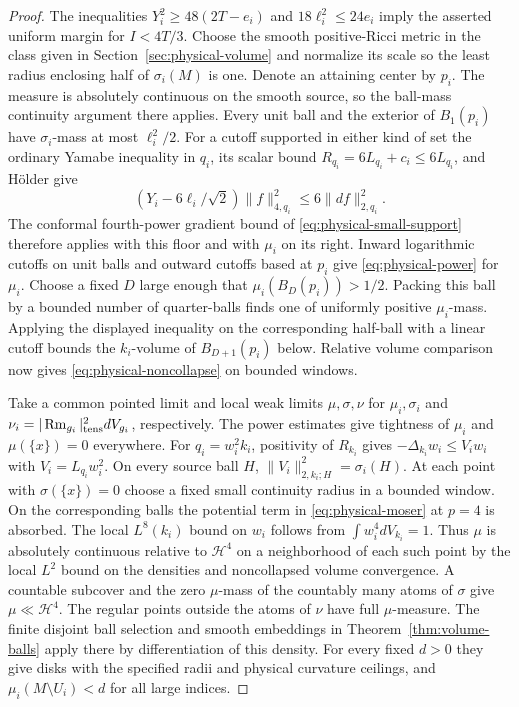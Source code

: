 \begin{proof}
The inequalities \(Y_i^2\ge48(2T-e_i)\) and
\(18\ell_i^2\le24e_i\) imply the asserted uniform margin for
\(I<4T/3\). Choose the smooth positive-Ricci metric in the class
given in Section~\ref{sec:physical-volume} and normalize its scale
so the least radius enclosing half of \(\sigma_i(M)\) is one.
Denote an attaining center by \(p_i\). The measure is absolutely
continuous on the smooth source, so the ball-mass continuity argument
there applies. Every unit ball and the exterior of \(B_1(p_i)\)
have \(\sigma_i\)-mass at most \(\ell_i^2/2\). For a cutoff
supported in either kind of set the ordinary Yamabe inequality in
\(q_i\), its scalar bound \(R_{q_i}=6L_{q_i}+c_i\le6L_{q_i}\),
and H\"older give
\[
 (Y_i-6\ell_i/\sqrt 2)\|f\|_{4,q_i}^2\le6\|df\|_{2,q_i}^2.
\]
The conformal fourth-power gradient bound of
\eqref{eq:physical-small-support} therefore applies with this floor
and with \(\mu_i\) on its right. Inward logarithmic cutoffs on
unit balls and outward cutoffs based at \(p_i\) give
\eqref{eq:physical-power} for \(\mu_i\). Choose a fixed \(D\) large
enough that \(\mu_i(B_D(p_i))>1/2\). Packing this ball by a bounded
number of quarter-balls finds one of uniformly positive
\(\mu_i\)-mass. Applying the displayed inequality on the
corresponding half-ball with a linear cutoff bounds the
\(k_i\)-volume of \(B_{D+1}(p_i)\) below. Relative volume comparison
now gives \eqref{eq:physical-noncollapse} on bounded windows.

Take a common pointed limit and local weak limits
\(\mu,\sigma,\nu\) for \(\mu_i,\sigma_i\) and
\(\nu_i=|\operatorname{Rm}_{g_i}|^2_{\rm tens}dV_{g_i}\), respectively.
The power estimates give tightness of \(\mu_i\) and
\(\mu(\{x\})=0\) everywhere. For \(q_i=w_i^2k_i\), positivity
of \(R_{k_i}\) gives
\(-\Delta_{k_i}w_i\le V_iw_i\) with \(V_i=L_{q_i}w_i^2\).
On every source ball \(H\), \(\|V_i\|_{2,k_i;H}^2=\sigma_i(H)\).
At each point with \(\sigma(\{x\})=0\) choose a fixed small
continuity radius in a bounded window. On the corresponding balls
the potential term in \eqref{eq:physical-moser} at \(p=4\) is
absorbed. The local \(L^8(k_i)\) bound on \(w_i\) follows from
\(\int w_i^4dV_{k_i}=1\). Thus \(\mu\) is absolutely continuous
relative to \(\mathcal H^4\) on a neighborhood of each such point
by the local \(L^2\) bound on the densities and noncollapsed volume
convergence. A countable subcover and the zero \(\mu\)-mass of the
countably many atoms of \(\sigma\) give \(\mu\ll\mathcal H^4\).
The regular points outside the atoms of \(\nu\) have full
\(\mu\)-measure. The finite disjoint ball selection and smooth
embeddings in Theorem~\ref{thm:volume-balls} apply there by
differentiation of this density. For every fixed \(d>0\) they
give disks with the specified radii and physical curvature ceilings,
and \(\mu_i(M\setminus U_i)<d\) for all large indices.


\end{proof}
